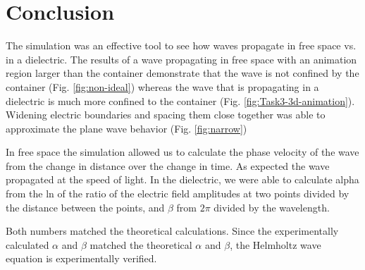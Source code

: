 \newpage
\section{Conclusion}\label{sec:conclusion}
The simulation was an effective tool to see how waves propagate in free space vs. in a dielectric.
The results of a wave propagating in free space with an animation region larger than the container demonstrate that the wave is not confined by the container (Fig. \ref{fig:non-ideal}) whereas the wave that is propagating in a dielectric is much more confined to the container (Fig. \ref{fig:Task3-3d-animation}).
Widening electric boundaries and spacing them close together was able to approximate the plane wave behavior (Fig. \ref{fig:narrow}) 

In free space the simulation allowed us to calculate the phase velocity of the wave from the change in distance over the change in time.
As expected the wave propagated at the speed of light. 
In the dielectric, we were able to calculate alpha from the ln of the ratio of the electric field amplitudes at two points divided by the distance between the  points, and $\beta$ from $2\pi$ divided by the wavelength. 

Both numbers matched the theoretical calculations.
Since the experimentally calculated $\alpha$ and $\beta$ matched the theoretical $\alpha$ and $\beta$,  the Helmholtz wave equation is experimentally verified. 
